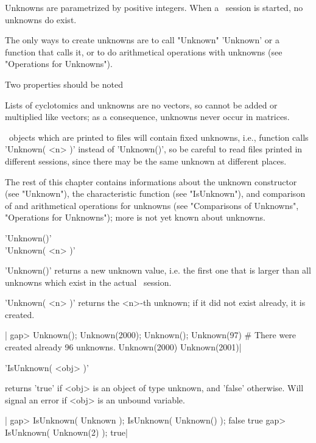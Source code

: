 Unknowns are  parametrized by positive integers.  When a \GAP\ session
is started, no unknowns do exist.

The only ways to create unknowns are to call  "Unknown" 'Unknown' or a
function that calls it, or to do arithmetical operations with unknowns
(see "Operations for Unknowns").

Two properties should be noted\:

Lists  of cyclotomics and unknowns are  no vectors, so cannot be added
or multiplied like vectors; as a  consequence, unknowns never occur in
matrices.

\GAP\ objects  which are printed to files will contain fixed unknowns,
i.e., function calls 'Unknown(  <n> )'  instead of 'Unknown()',  so be
careful to read files printed in different  sessions, since  there may
be the same unknown at different places.

The rest  of this  chapter  contains  informations  about the  unknown
constructor  (see   "Unknown"),  the  characteristic   function   (see
"IsUnknown"),  and  comparison  of  and  arithmetical  operations  for
unknowns  (see "Comparisons  of Unknowns", "Operations for Unknowns");
more is not yet known about unknowns.


'Unknown()'\\
'Unknown( <n> )'

'Unknown()'  returns  a new unknown value, i.e. the first  one that is
larger than all unknowns which exist in the actual \GAP\ session.

'Unknown(  <n>  )' returns the  <n>-th  unknown;  if it did not  exist
already, it is created.

|    gap> Unknown(); Unknown(2000); Unknown();
    Unknown(97)     # There were created already 96 unknowns.
    Unknown(2000)
    Unknown(2001)|


'IsUnknown( <obj> )'

returns  'true' if  <obj>  is  an  object of type unknown, and 'false'
otherwise.  Will signal an error if <obj> is an unbound variable.

|    gap> IsUnknown( Unknown ); IsUnknown( Unknown() );
    false
    true
    gap> IsUnknown( Unknown(2) );
    true|


